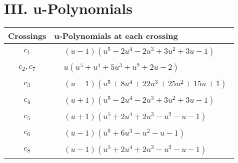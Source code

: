 \documentclass[1p]{elsarticle_modified}
\theoremstyle{definition}
\begin{document}
\newpage\renewcommand{\arraystretch}{1}
\centering \section*{ III. u-Polynomials}
\begin{tabular}{m{50pt}|m{274pt}}
Crossings & \hspace{64pt}u-Polynomials at each crossing \\
\hline $$\begin{aligned}c_{1}\end{aligned}$$&$\begin{aligned}
&(u-1)(u^5-2 u^4-2 u^3+3 u^2+3 u-1)
\end{aligned}$\\
\hline $$\begin{aligned}c_{2},c_{7}\end{aligned}$$&$\begin{aligned}
&u(u^5+u^4+5 u^3+u^2+2 u-2)
\end{aligned}$\\
\hline $$\begin{aligned}c_{3}\end{aligned}$$&$\begin{aligned}
&(u-1)(u^5+8 u^4+22 u^3+25 u^2+15 u+1)
\end{aligned}$\\
\hline $$\begin{aligned}c_{4}\end{aligned}$$&$\begin{aligned}
&(u+1)(u^5-2 u^4-2 u^3+3 u^2+3 u-1)
\end{aligned}$\\
\hline $$\begin{aligned}c_{5}\end{aligned}$$&$\begin{aligned}
&(u+1)(u^5+2 u^4+2 u^3- u^2- u-1)
\end{aligned}$\\
\hline $$\begin{aligned}c_{6}\end{aligned}$$&$\begin{aligned}
&(u-1)(u^5+6 u^3- u^2- u-1)
\end{aligned}$\\
\hline $$\begin{aligned}c_{8}\end{aligned}$$&$\begin{aligned}
&(u-1)(u^5+2 u^4+2 u^3- u^2- u-1)
\end{aligned}$\\
\hline
\end{tabular}\newpage\renewcommand{\arraystretch}{1}
\end{document}
